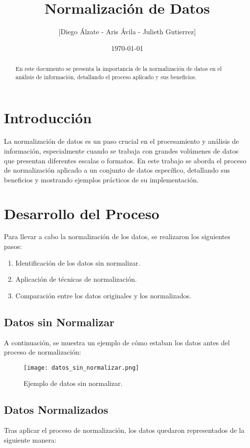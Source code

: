 \documentclass[12pt]{article}
\title{Normalización de Datos}
\author{[Diego Álzate - Aris Ávila - Julieth Gutierrez]}
\date{\today}
\begin{document}
\maketitle

\begin{abstract}
    En este documento se presenta la importancia de la normalización de datos en el análisis de información, detallando el proceso aplicado y sus beneficios.
\end{abstract}

\section{Introducción}
La normalización de datos es un paso crucial en el procesamiento y análisis de información, especialmente cuando se trabaja con grandes volúmenes de datos que presentan diferentes escalas o formatos. En este trabajo se aborda el proceso de normalización aplicado a un conjunto de datos específico, detallando sus beneficios y mostrando ejemplos prácticos de su implementación.

\section{Desarrollo del Proceso}
Para llevar a cabo la normalización de los datos, se realizaron los siguientes pasos:
\begin{enumerate}
    \item Identificación de los datos sin normalizar.
    \item Aplicación de técnicas de normalización.
    \item Comparación entre los datos originales y los normalizados.
\end{enumerate}

\subsection{Datos sin Normalizar}
A continuación, se muestra un ejemplo de cómo estaban los datos antes del proceso de normalización:

\begin{figure}[h]
    \centering
    \texttt{[image: datos\_sin\_normalizar.png]}
    \caption{Ejemplo de datos sin normalizar.}
    \label{fig:sin_normalizar}
\end{figure}

\subsection{Datos Normalizados}
Tras aplicar el proceso de normalización, los datos quedaron representados de la siguiente manera:
\end{document}

